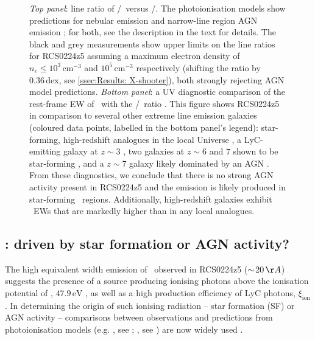\begin{figure}
    \caption[\CIV/\HeII\ line ratio diagnostics]{\textit{Top panel}: line ratio of \CIV/\CIII\ versus \CIV/\HeII. The photoionisation models show predictions for nebular emission \citep[indicated as star-forming or SF; models from][]{2016MNRAS.462.1757G} and narrow-line region AGN emission \citep[models from][]{2016MNRAS.456.3354F}; for both, see the description in the text for details. The black and grey measurements show upper limits on the line ratios for RCS0224z5 assuming a maximum electron density of $n_e \leq 10^3 \, \mathrm{cm^{-3}}$ and $10^5 \, \mathrm{cm^{-3}}$ respectively (shifting the ratio by $0.36 \, \mathrm{dex}$, see \cref{ssec:Results: X-shooter}), both strongly rejecting AGN model predictions. \textit{Bottom panel}: a UV diagnostic comparison of the rest-frame EW of \CIV\ with the \CIV/\CIII\ ratio \citep[from][]{2019MNRAS.487..333H}. This figure shows RCS0224z5 in comparison to several other extreme line emission galaxies (coloured data points, labelled in the bottom panel's legend): star-forming, high-redshift analogues in the local Universe \citep[; see text for details]{2017MNRAS.472.2608S, 2019ApJ...874...93B}, a LyC-emitting galaxy at $z \sim 3$ \citep{2020MNRAS.491.1093V}, two galaxies at $z \sim 6$ and $7$ shown to be star-forming \citep{2015MNRAS.454.1393S, 2017ApJ...836L..14M}, and a $z \sim 7$ galaxy likely dominated by an AGN \citep{2017ApJ...851...40L}. From these diagnostics, we conclude that there is no strong AGN activity present in RCS0224z5 and the emission is likely produced in star-forming \HII\ regions. Additionally, high-redshift galaxies exhibit \CIV\ EWs that are markedly higher than in any local analogues.}
    \label{fig:Line ratios CIV-HeII}
\end{figure}

\subsection{\texorpdfstring{\CIV}{CIV}: driven by star formation or AGN activity?}
\label{ssec:Discussion: CIV}

The high equivalent width emission of \CIV\ observed in RCS0224z5 ($\ssim 20 \, \Angstrom$) suggests the presence of a source producing ionising photons above the ionisation potential of \CIII, $47.9 \, \mathrm{eV}$ \citep[e.g.][]{2019ApJ...878L...3B}, as well as a high production efficiency of LyC photons, $\xi_\text{ion}$ \citep[e.g.][]{2015MNRAS.454.1393S}. In determining the origin of such ionising radiation -- star formation (SF) or AGN activity -- comparisons between observations and predictions from photoionisation models (e.g. , see \citealt{2013RMxAA..49..137F}; , see \citealt{2013ApJS..208...10D}) are now widely used \citep[e.g.][]{2001ApJ...556..121K, 2016MNRAS.462.1757G, 2016MNRAS.456.3354F, 2019A&ARv..27....3M}.


